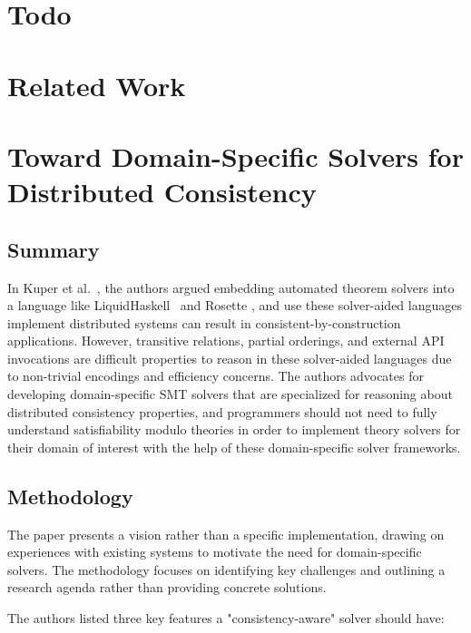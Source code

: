 \section{Todo}

\section{Related Work}

{\color{red}

  \section{Toward Domain-Specific Solvers for Distributed Consistency}

  \subsection{Summary}

  In Kuper et al.~\cite{kuper2019toward}, the authors argued
  embedding automated theorem
  solvers into a language like
  LiquidHaskell~\cite{vazou2014liquidhaskell} and Rosette
  \cite{torlak2014a}, and use these solver-aided languages implement
  distributed systems
  can result in consistent-by-construction applications. However, transitive
  relations, partial orderings, and external API invocations are difficult
  properties to reason in these solver-aided languages due to non-trivial
  encodings and efficiency concerns. The authors advocates for developing
  domain-specific SMT solvers that are specialized for reasoning
  about distributed
  consistency properties, and programmers should not need to fully understand
  satisfiability modulo theories in order to implement theory solvers for their
  domain of interest with the help of these domain-specific solver frameworks.

  \subsection{Methodology}

  The paper presents a vision rather than a specific implementation, drawing on
  experiences with existing systems to motivate the need for domain-specific
  solvers. The methodology focuses on identifying key challenges and outlining a
  research agenda rather than providing concrete solutions.

  The authors listed three key features a "consistency-aware" solver
  should have:

}
